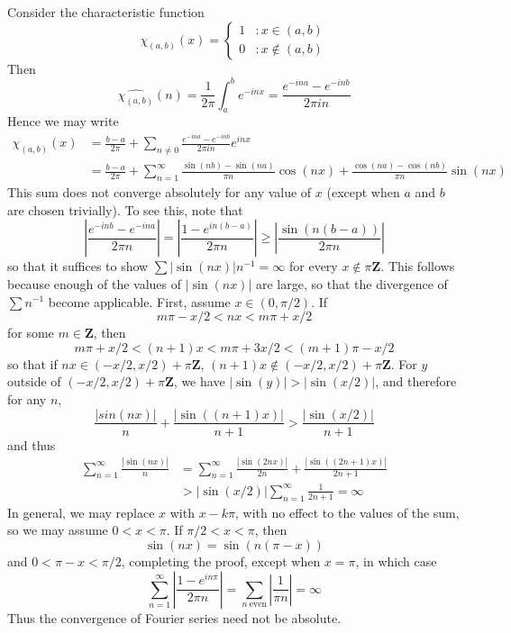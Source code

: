 \begin{example}
    Consider the characteristic function
    \[ \chi_{(a,b)}(x) = \begin{cases} 1 & : x \in (a,b) \\ 0 & : x \not \in (a,b) \end{cases} \]
    Then
    \[ \widehat{\chi_{(a,b)}}(n) = \frac{1}{2\pi} \int_a^b e^{-inx} = \frac{e^{-ina} - e^{-inb}}{2\pi i n} \]
    Hence we may write
    \begin{align*}
        \chi_{(a,b)}(x) &= \frac{b-a}{2\pi} + \sum_{n \neq 0} \frac{e^{-ina} - e^{-inb}}{2 \pi i n} e^{inx}\\
        &= \frac{b-a}{2\pi} + \sum_{n = 1}^\infty \frac{\sin(nb) - \sin(na)}{\pi n} \cos(nx) + \frac{\cos(na) - \cos(nb)}{\pi n} \sin(nx)
    \end{align*}
    This sum does not converge absolutely for any value of $x$ (except when $a$ and $b$ are chosen trivially). To see this, note that
    \[ \left|\frac{e^{-inb} - e^{-ina}}{2 \pi n}\right| = \left| \frac{1 - e^{in(b-a)}}{2 \pi n} \right| \geq \left| \frac{\sin(n(b-a))}{2 \pi n} \right| \]
    so that it suffices to show $\sum |\sin(nx)| n^{-1} = \infty$ for every $x \not \in \pi \mathbf{Z}$. This follows because enough of the values of $|\sin(nx)|$ are large, so that the divergence of $\sum n^{-1}$ become applicable. First, assume $x \in (0,\pi/2)$. If
    \[ m \pi - x/2 < nx < m \pi + x/2 \]
    for some $m \in \mathbf{Z}$, then
    \[ m \pi + x/2 < (n+1)x < m \pi + 3x/2 < (m+1) \pi - x/2 \]
    so that if $nx \in (-x/2,x/2) + \pi \mathbf{Z}$, $(n+1)x \not \in (-x/2,x/2) + \pi \mathbf{Z}$. For $y$ outside of $(-x/2,x/2) + \pi \mathbf{Z}$, we have $|\sin(y)| > |\sin(x/2)|$, and therefore for any $n$,
    \[ \frac{|sin(nx)|}{n} + \frac{|\sin((n+1)x)|}{n+1} > \frac{|\sin(x/2)|}{n+1} \]
    and thus
    \begin{align*}
        \sum_{n = 1}^\infty \frac{|\sin(nx)|}{n} &= \sum_{n = 1}^\infty \frac{|\sin(2nx)|}{2n} + \frac{|\sin((2n+1)x)|}{2n+1}\\
        &> |\sin(x/2)| \sum_{n = 1}^\infty \frac{1}{2n+1} = \infty
    \end{align*}
    In general, we may replace $x$ with $x - k \pi$, with no effect to the values of the sum, so we may assume $0 < x < \pi$. If $\pi/2 < x < \pi$, then
    \[ \sin(nx) = \sin(n(\pi - x)) \]
    and $0 < \pi - x < \pi/2$, completing the proof, except when $x = \pi$, in which case
    \[ \sum_{n = 1}^\infty \left| \frac{1 - e^{in \pi}}{2 \pi n} \right| = \sum_{n\ \text{even}} \left| \frac{1}{\pi n} \right| = \infty \]
    Thus the convergence of Fourier series need not be absolute.
\end{example}




